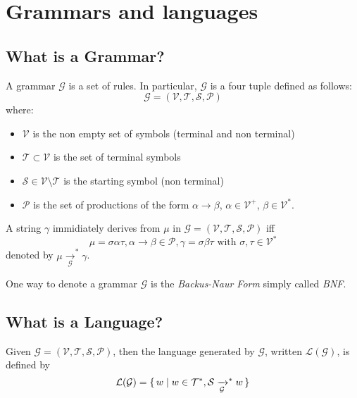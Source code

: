\chapter{Grammars and languages}

\section{What is a Grammar?}

A grammar $\mathcal{G}$ is a set of rules. In particular, $\mathcal{G}$ is a four tuple defined as follows:
\begin{equation}
\mathcal{G} = (\mathcal{V}, \mathcal{T}, \mathcal{S}, \mathcal{P})
\end{equation}
where:
\begin{itemize}
\item $\mathcal{V}$ is the non empty set of symbols (terminal and non terminal)
\item $\mathcal{T} \subset \mathcal{V}$ is the set of terminal symbols
\item $\mathcal{S} \in \mathcal{V} \setminus \mathcal{T}$ is the starting symbol (non terminal)
\item $\mathcal{P}$ is the set of productions of the form $\alpha \rightarrow \beta$, $\alpha \in \mathcal{V}^+$, $\beta \in \mathcal{V}^*$.
\end{itemize}
\noindent
A string $\gamma$ immidiately derives from $\mu$ in $\mathcal{G} = (\mathcal{V}, \mathcal{T}, \mathcal{S}, \mathcal{P})$ iff
\begin{equation}
\mu = \sigma \alpha \tau, \alpha \rightarrow \beta \in \mathcal{P}, \gamma = \sigma \beta \tau \text{ with } \sigma,\tau \in \mathcal{V}^*
\end{equation}
denoted by $\mu \xrightarrow[\mathcal{G}]{}^* \gamma$.

\noindent
One way to denote a grammar $\mathcal{G}$ is the \textit{Backus-Naur Form} simply called \textit{BNF}.





\section{What is a Language?}
Given $\mathcal{G} = (\mathcal{V}, \mathcal{T}, \mathcal{S}, \mathcal{P})$, then the language generated by $\mathcal{G}$, written $\mathcal{L(G)}$, is defined by
\[
\mathcal{L(G)} = \set{ w | w \in \mathcal{T}^*, \mathcal{S} \xrightarrow[\mathcal{G}]{}^* w }
\]

